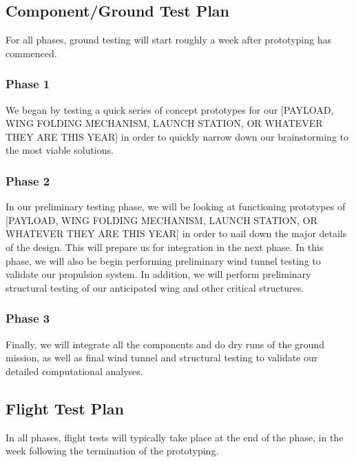 \documentclass[proposal]{byu-aero}
\begin{document}
\subsection{Component/Ground Test Plan}
\label{ssec:GroundTestingPlan}

For all phases, ground testing will start roughly a week after prototyping has commenced. 

\subsubsection{Phase 1} We began by testing a quick series of concept prototypes for our {\color{BYUred}[PAYLOAD, WING FOLDING MECHANISM, LAUNCH STATION, OR WHATEVER THEY ARE THIS YEAR]} in order to quickly narrow down our brainstorming to the most viable solutions.

\subsubsection{Phase 2} In our preliminary testing phase, we will be looking at functioning prototypes of {\color{BYUred}[PAYLOAD, WING FOLDING MECHANISM, LAUNCH STATION, OR WHATEVER THEY ARE THIS YEAR]} in order to nail down the major details of the design.  This will prepare us for integration in the next phase.  In this phase, we will also be begin performing preliminary wind tunnel testing to validate our propulsion system. In addition, we will perform preliminary structural testing of our anticipated wing and other critical structures.

\subsubsection{Phase 3} Finally, we will integrate all the components and do dry runs of the ground mission, as well as final wind tunnel and structural testing to validate our detailed computational analyses.





\subsection{Flight Test Plan}
\label{ssec:FlightTestingPlan}

In all phases, flight tests will typically take place at the end of the phase, in the week following the termination of the prototyping.
\end{document}
